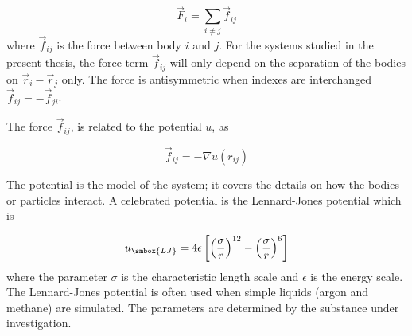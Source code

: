 \begin{equation}
  \vec{F}_i = \sum_{i\not= j} \vec{f}_{ij}
\end{equation}
where $\vec{f}_{ij}$ is the force between body $i$ and $j$. For the
systems studied in the present thesis, the force term $\vec{f}_{ij}$
will only depend on the separation of the bodies \ie on $\vec{r}_i -
\vec{r}_j$ only. The force is antisymmetric when indexes are interchanged
\ie $\vec{f}_{ij} = -\vec{f}_{ji}$. 

The force $\vec{f}_{ij}$, is related to the potential $u$, as

\begin{equation}
  \vec{f}_{ij} = - \nabla u(r_{ij})
\end{equation}

The potential is the model of the system; it covers the details on how
the bodies or particles interact. A celebrated potential is the
Lennard-Jones potential which is

\begin{equation}
  u_{\smbox{LJ}} = 4\epsilon \left[\left(\frac{\sigma}{r}\right)^{12}
    - \left(\frac{\sigma}{r}\right)^6 \right]
\end{equation}
where the parameter $\sigma$ is the characteristic length scale and
$\epsilon$ is the energy scale. The Lennard-Jones potential is often
used when simple liquids (\eg argon and methane) are simulated. The
parameters are determined by the substance under investigation.

